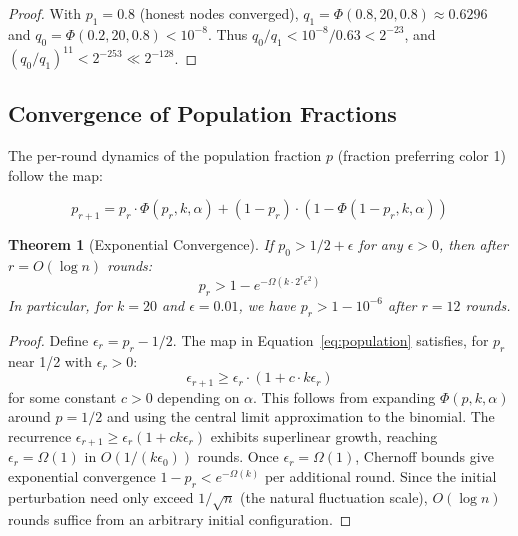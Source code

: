 \documentclass[11pt,a4paper]{article}
\newtheorem{theorem}{Theorem}[section]
\begin{document}
\begin{proof}
With $p_1 = 0.8$ (honest nodes converged), $q_1 = \Phi(0.8, 20, 0.8) \approx 0.6296$ and
$q_0 = \Phi(0.2, 20, 0.8) < 10^{-8}$. Thus $q_0/q_1 < 10^{-8}/0.63 < 2^{-23}$, and
$(q_0/q_1)^{11} < 2^{-253} \ll 2^{-128}$.
\end{proof}

\subsection{Convergence of Population Fractions}

The per-round dynamics of the population fraction $p$ (fraction preferring color 1)
follow the map:

\begin{equation}
p_{r+1} = p_r \cdot \Phi(p_r, k, \alpha) + (1 - p_r) \cdot (1 - \Phi(1 - p_r, k, \alpha))
\label{eq:population}
\end{equation}

\begin{theorem}[Exponential Convergence]
\label{thm:convergence}
If $p_0 > 1/2 + \epsilon$ for any $\epsilon > 0$, then after $r = O(\log n)$ rounds:
\[
p_r > 1 - e^{-\Omega(k \cdot 2^r \epsilon^2)}
\]
In particular, for $k = 20$ and $\epsilon = 0.01$, we have $p_r > 1 - 10^{-6}$ after
$r = 12$ rounds.
\end{theorem}

\begin{proof}
Define $\epsilon_r = p_r - 1/2$. The map in Equation~\ref{eq:population} satisfies, for
$p_r$ near 1/2 with $\epsilon_r > 0$:
\[
\epsilon_{r+1} \geq \epsilon_r \cdot \left(1 + c \cdot k \epsilon_r\right)
\]
for some constant $c > 0$ depending on $\alpha$. This follows from expanding $\Phi(p, k, \alpha)$
around $p = 1/2$ and using the central limit approximation to the binomial.
The recurrence $\epsilon_{r+1} \geq \epsilon_r(1 + ck\epsilon_r)$ exhibits superlinear growth,
reaching $\epsilon_r = \Omega(1)$ in $O(1/(k\epsilon_0))$ rounds. Once $\epsilon_r = \Omega(1)$,
Chernoff bounds give exponential convergence $1 - p_r < e^{-\Omega(k)}$ per additional round.
Since the initial perturbation need only exceed $1/\sqrt{n}$ (the natural fluctuation scale),
$O(\log n)$ rounds suffice from an arbitrary initial configuration.
\end{proof}

\end{document}
